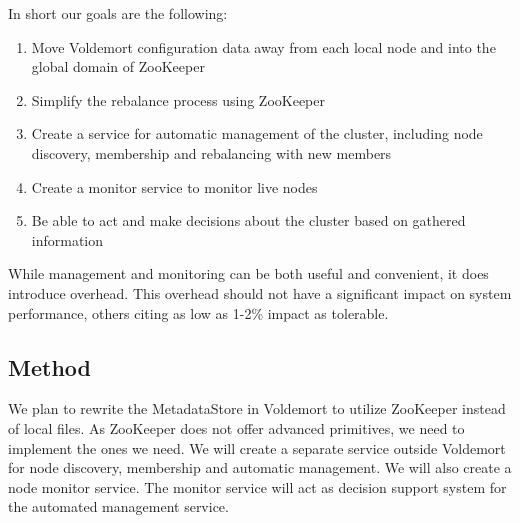 
In short our goals are the following:

\begin{enumerate}
	\item{Move Voldemort configuration data away from each local node and into the global domain of ZooKeeper}
	\item{Simplify the rebalance process using ZooKeeper}
	\item{Create a service for automatic management of the cluster, including node discovery, membership and rebalancing with new members}
	\item{Create a monitor service to monitor live nodes}
	\item{Be able to act and make decisions about the cluster based on gathered information}
\end{enumerate}

While management and monitoring can be both useful and convenient, it does introduce overhead. This overhead should not have a significant impact on system performance, others citing as low as 1-2\% impact as tolerable.

\subsection{Method}
We plan to rewrite the MetadataStore in Voldemort to utilize ZooKeeper instead of local files. As ZooKeeper does not offer advanced primitives, we need to implement the ones we need. We will create a separate service outside Voldemort for node discovery, membership and automatic management. We will also create a node monitor service. The monitor service will act as decision support system for the automated management service. 





